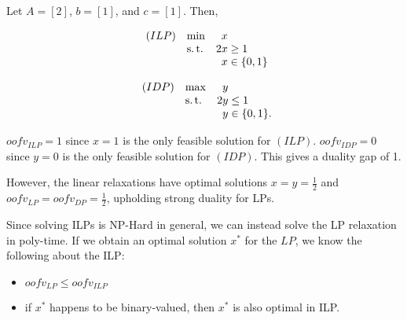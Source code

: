 \begin{exm}
    Let $A = [2]$, $b = [1]$, and $c = [1]$. Then,
    \begin{multicols}{2}
        \noindent
        \begin{equation*}
        \begin{array}{llr@{}l@{}}
            (ILP)   & \min  &  x    &               \\
                    & \st   & 2x    & {}\ge 1       \\
                    &       &  x    & {}\in \{0, 1\}
        \end{array}
        \end{equation*}
        
        \noindent
        \begin{equation*}
        \begin{array}{llr@{}l@{}}
            (IDP)   & \max  &  y    &                   \\
                    & \st   & 2y    & {}\le 1           \\
                    &       &  y    & {}\in \{0, 1\}.
        \end{array}
        \end{equation*}
    \end{multicols}
    $oofv_{ILP} = 1$ since $x = 1$ is the only feasible solution for $(ILP)$. $oofv_{IDP} = 0$ since $y = 0$ is the only feasible solution for $(IDP)$. This gives a duality gap of 1. 
    
    However, the linear relaxations have optimal solutions $x = y = \frac12$ and $oofv_{LP} = oofv_{DP} = \frac12$, upholding strong duality for LPs.
\end{exm}

Since solving ILPs is NP-Hard in general, we can instead solve the LP relaxation in poly-time. If we obtain an optimal solution $x^*$ for the $LP$, we know the following about the ILP:
\begin{itemize}
    \item $oofv_{LP} \le oofv_{ILP}$
    \item if $x^*$ happens to be binary-valued, then $x^*$ is also optimal in ILP.
\end{itemize}

